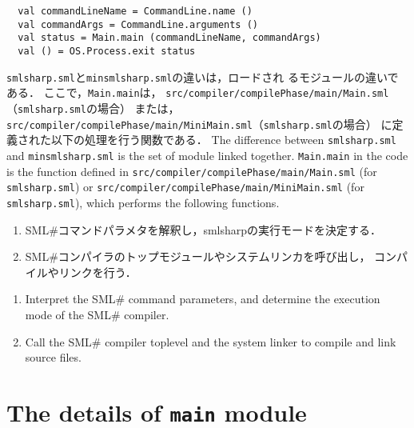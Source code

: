 \documentclass{jbook}
\newcommand{\txt}[2]{#2}
\newcommand{\smlsharp}{SML\#}
\newcommand{\code}[1]{\mbox{\large\tt #1}}
\begin{document}
\begin{enumerate}
\begin{verbatim}
  val commandLineName = CommandLine.name ()
  val commandArgs = CommandLine.arguments ()
  val status = Main.main (commandLineName, commandArgs)
  val () = OS.Process.exit status
\end{verbatim}

\ifjp%
	\code{smlsharp.sml}と\code{minsmlsharp.sml}の違いは，ロードされ
るモジュールの違いである．
	ここで，\code{Main.main}は，
\code{src/compiler/compilePhase/main/Main.sml}（\code{smlsharp.sml}の場合）
または，
\code{src/compiler/compilePhase/main/MiniMain.sml}（\code{smlsharp.sml}の場合）
に定義された以下の処理を行う関数である．
\else%
	The difference between \code{smlsharp.sml} and
\code{minsmlsharp.sml} is the set of module linked together.
	\code{Main.main} in the code is the function defined
in \code{src/compiler/compilePhase/main/Main.sml} (for \code{smlsharp.sml})
or
\code{src/compiler/compilePhase/main/MiniMain.sml} (for \code{smlsharp.sml}),
which performs the following functions.
\fi%

\ifjp%
\begin{enumerate}
\item \smlsharp{}コマンドパラメタを解釈し，smlsharp{}の実行モードを決定する．
\item \smlsharp{}コンパイラのトップモジュールやシステムリンカを呼び出し，
コンパイルやリンクを行う．
\end{enumerate}
\else%
\begin{enumerate}
\item Interpret the \smlsharp{} command parameters, and  determine the
execution mode of the \smlsharp{} compiler.
\item Call the \smlsharp{} compiler toplevel and the system linker
to compile and link source files.
\end{enumerate}
\fi%
\end{enumerate}

\section{\txt{\code{main}モジュールの詳細}{The details of \code{main} module}}
\end{document}
